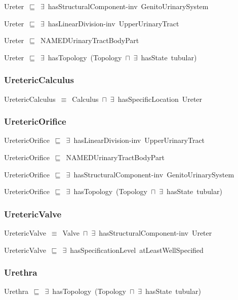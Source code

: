 \documentclass{article}
\begin{document}
Ureter~\ensuremath{\sqsubseteq}~\ensuremath{\exists}~hasStructuralComponent-inv~GenitoUrinarySystem~

Ureter~\ensuremath{\sqsubseteq}~\ensuremath{\exists}~hasLinearDivision-inv~UpperUrinaryTract~

Ureter~\ensuremath{\sqsubseteq}~NAMEDUrinaryTractBodyPart~

Ureter~\ensuremath{\sqsubseteq}~\ensuremath{\exists}~hasTopology~(Topology~\ensuremath{\sqcap}~\ensuremath{\exists}~hasState~tubular)~

\subsubsection*{UretericCalculus}

UretericCalculus~\ensuremath{\equiv}~Calculus~\ensuremath{\sqcap}~\ensuremath{\exists}~hasSpecificLocation~Ureter

\subsubsection*{UretericOrifice}

UretericOrifice~\ensuremath{\sqsubseteq}~\ensuremath{\exists}~hasLinearDivision-inv~UpperUrinaryTract~

UretericOrifice~\ensuremath{\sqsubseteq}~NAMEDUrinaryTractBodyPart~

UretericOrifice~\ensuremath{\sqsubseteq}~\ensuremath{\exists}~hasStructuralComponent-inv~GenitoUrinarySystem~

UretericOrifice~\ensuremath{\sqsubseteq}~\ensuremath{\exists}~hasTopology~(Topology~\ensuremath{\sqcap}~\ensuremath{\exists}~hasState~tubular)~

\subsubsection*{UretericValve}

UretericValve~\ensuremath{\equiv}~Valve~\ensuremath{\sqcap}~\ensuremath{\exists}~hasStructuralComponent-inv~Ureter

UretericValve~\ensuremath{\sqsubseteq}~\ensuremath{\exists}~hasSpecificationLevel~atLeastWellSpecified~

\subsubsection*{Urethra}

Urethra~\ensuremath{\sqsubseteq}~\ensuremath{\exists}~hasTopology~(Topology~\ensuremath{\sqcap}~\ensuremath{\exists}~hasState~tubular)~
\end{document}
